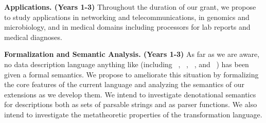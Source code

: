 \documentclass[11pt]{article}
\begin{document}
\noindent
{\bf Applications.  (Years 1-3)}
Throughout the duration of our grant,
we propose to study applications
in networking and telecommunications, in genomics and
microbiology, and in medical domains including processors for 
lab reports and medical diagnoses. 


\noindent
{\bf Formalization and Semantic Analysis. (Years 1-3)}
As far as we are aware, no data description language
anything like \datatype{}
(including \pads~\cite{fisher+:pads}, 
\packettypes~\cite{sigcomm00}, 
\datascript~\cite{gpce02}, and \blt~\cite{eger:blt})
has been given a formal semantics.  
We propose to ameliorate this situation by
formalizing the core features of the current language
and analyzing the semantics of our extensions as we develop them.
We intend to investigate denotational semantics for descriptions both as sets
of parsable strings and as parser functions. 
We also intend to investigate the metatheoretic properties of the 
transformation language.



\end{document}
